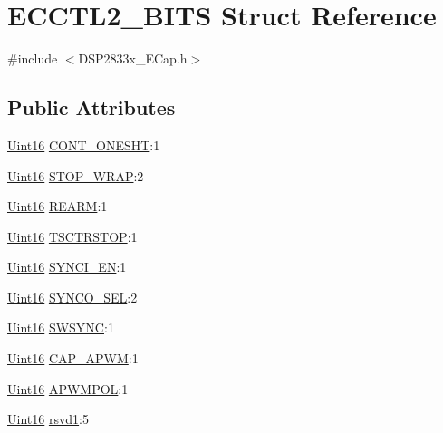 \hypertarget{struct_e_c_c_t_l2___b_i_t_s}{}\section{E\+C\+C\+T\+L2\+\_\+\+B\+I\+T\+S Struct Reference}
\label{struct_e_c_c_t_l2___b_i_t_s}


{\ttfamily \#include $<$D\+S\+P2833x\+\_\+\+E\+Cap.\+h$>$}

\subsection*{Public Attributes}
\begin{DoxyCompactItemize}
\item 
\hyperlink{_d_s_p2833x___device_8h_a59a9f6be4562c327cbfb4f7e8e18f08b}{Uint16} \hyperlink{struct_e_c_c_t_l2___b_i_t_s_a14aaad9e9e0c72f168966250acb005dc}{C\+O\+N\+T\+\_\+\+O\+N\+E\+S\+H\+T}\+:1
\item 
\hyperlink{_d_s_p2833x___device_8h_a59a9f6be4562c327cbfb4f7e8e18f08b}{Uint16} \hyperlink{struct_e_c_c_t_l2___b_i_t_s_ac0eb9714435ec841c66225b6ddc4f272}{S\+T\+O\+P\+\_\+\+W\+R\+A\+P}\+:2
\item 
\hyperlink{_d_s_p2833x___device_8h_a59a9f6be4562c327cbfb4f7e8e18f08b}{Uint16} \hyperlink{struct_e_c_c_t_l2___b_i_t_s_a0bf6b1897a0c9996d6af69cf556faf02}{R\+E\+A\+R\+M}\+:1
\item 
\hyperlink{_d_s_p2833x___device_8h_a59a9f6be4562c327cbfb4f7e8e18f08b}{Uint16} \hyperlink{struct_e_c_c_t_l2___b_i_t_s_a8cbdc454e8e8a6026e2c7cc283d53e14}{T\+S\+C\+T\+R\+S\+T\+O\+P}\+:1
\item 
\hyperlink{_d_s_p2833x___device_8h_a59a9f6be4562c327cbfb4f7e8e18f08b}{Uint16} \hyperlink{struct_e_c_c_t_l2___b_i_t_s_af9812042d466ebeec961ae900da093a8}{S\+Y\+N\+C\+I\+\_\+\+E\+N}\+:1
\item 
\hyperlink{_d_s_p2833x___device_8h_a59a9f6be4562c327cbfb4f7e8e18f08b}{Uint16} \hyperlink{struct_e_c_c_t_l2___b_i_t_s_a04d25d4e6b9af8542a1b51f89370992c}{S\+Y\+N\+C\+O\+\_\+\+S\+E\+L}\+:2
\item 
\hyperlink{_d_s_p2833x___device_8h_a59a9f6be4562c327cbfb4f7e8e18f08b}{Uint16} \hyperlink{struct_e_c_c_t_l2___b_i_t_s_ac74e602ef54f51c03a9c1a4f3fd37f83}{S\+W\+S\+Y\+N\+C}\+:1
\item 
\hyperlink{_d_s_p2833x___device_8h_a59a9f6be4562c327cbfb4f7e8e18f08b}{Uint16} \hyperlink{struct_e_c_c_t_l2___b_i_t_s_a5a370ab37413118cd3509cd666066b4f}{C\+A\+P\+\_\+\+A\+P\+W\+M}\+:1
\item 
\hyperlink{_d_s_p2833x___device_8h_a59a9f6be4562c327cbfb4f7e8e18f08b}{Uint16} \hyperlink{struct_e_c_c_t_l2___b_i_t_s_a3384e0b748d0e45dfc9a6df07b3f96d1}{A\+P\+W\+M\+P\+O\+L}\+:1
\item 
\hyperlink{_d_s_p2833x___device_8h_a59a9f6be4562c327cbfb4f7e8e18f08b}{Uint16} \hyperlink{struct_e_c_c_t_l2___b_i_t_s_a3bcf558007fd7ddf770f781c9c3e7aae}{rsvd1}\+:5
\end{DoxyCompactItemize}


